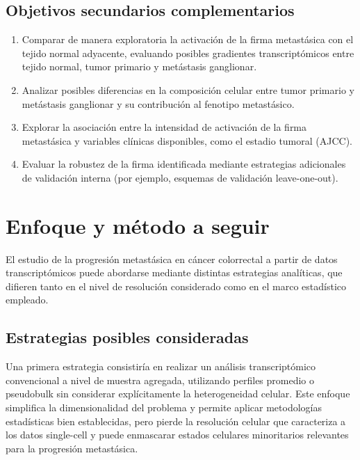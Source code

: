 \documentclass[11pt]{article}
\begin{document}
		\subsection{Objetivos secundarios complementarios}
			\begin{enumerate}
				\item Comparar de manera exploratoria la activación de la firma metastásica con el tejido normal adyacente, evaluando posibles gradientes transcriptómicos entre tejido normal, tumor primario y metástasis ganglionar.
				
				\item Analizar posibles diferencias en la composición celular entre tumor primario y metástasis ganglionar y su contribución al fenotipo metastásico.
				
				\item Explorar la asociación entre la intensidad de activación de la firma metastásica y variables clínicas disponibles, como el estadio tumoral (AJCC).
				
				\item Evaluar la robustez de la firma identificada mediante estrategias adicionales de validación interna (por ejemplo, esquemas de validación leave-one-out).
			\end{enumerate}
		
		
	\section{Enfoque y método a seguir}
		
		El estudio de la progresión metastásica en cáncer colorrectal a partir de datos transcriptómicos puede abordarse mediante distintas estrategias analíticas, que difieren tanto en el nivel de resolución considerado como en el marco estadístico empleado.
		
		\subsection{Estrategias posibles consideradas}
			
			Una primera estrategia consistiría en realizar un análisis transcriptómico convencional a nivel de muestra agregada, utilizando perfiles promedio o pseudobulk sin considerar explícitamente la heterogeneidad celular. Este enfoque simplifica la dimensionalidad del problema y permite aplicar metodologías estadísticas bien establecidas, pero pierde la resolución celular que caracteriza a los datos single-cell y puede enmascarar estados celulares minoritarios relevantes para la progresión metastásica.
			
\end{document}
